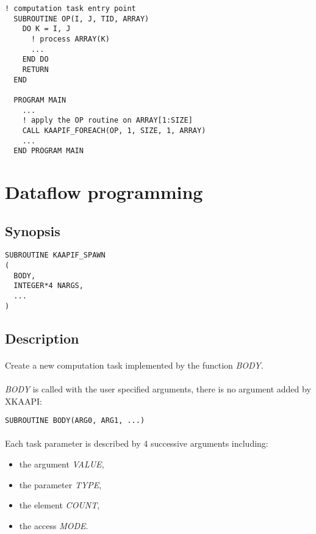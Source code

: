 \documentclass[a4paper, 11pt]{article}
\begin{document}
\begin{small}
\begin{lstlisting}[frame=tb]
  ! computation task entry point
  SUBROUTINE OP(I, J, TID, ARRAY)
    DO K = I, J
      ! process ARRAY(K)
      ...
    END DO
    RETURN
  END

  PROGRAM MAIN
    ...
    ! apply the OP routine on ARRAY[1:SIZE]
    CALL KAAPIF_FOREACH(OP, 1, SIZE, 1, ARRAY)
    ...
  END PROGRAM MAIN
\end{lstlisting}
\end{small}


\newpage
\section{Dataflow programming}
\subsection{Synopsis}
\begin{small}
\lstset{language=C}
\begin{lstlisting}[frame=tb]
SUBROUTINE KAAPIF_SPAWN
(
  BODY,
  INTEGER*4 NARGS,
  ...
)
\end{lstlisting}
\end{small}

\subsection{Description}
\paragraph{}
Create a new computation task implemented by the function \textit{BODY}.

\paragraph{}
\textit{BODY} is called with the user specified arguments, there is no
argument added by XKAAPI:\\
\begin{small}
\lstset{language=C}
\begin{lstlisting}[frame=tb]
SUBROUTINE BODY(ARG0, ARG1, ...)
\end{lstlisting}
\end{small}

\paragraph{}
Each task parameter is described by 4 successive arguments including:
\begin{itemize}
\item the argument \textit{VALUE},
\item the parameter \textit{TYPE},
\item the element \textit{COUNT},
\item the access \textit{MODE}.
\end{itemize}
\end{document}
